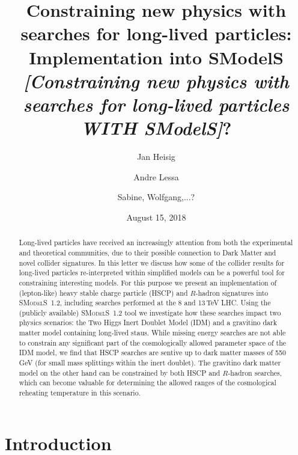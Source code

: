 \documentclass[preprint,number,sort&compress,twocolumn,3p]{elsstyarticle}
\newcommand{\smo}{\textsc{SModelS}}
\newcommand{\com}[1]{\emph{\color{red}[#1]}}  %
\begin{document}
\title{{%
Constraining new physics with
searches for long-lived particles:
Implementation into SModelS} \com{Constraining new physics with
searches for long-lived particles WITH SModelS}? }

\date{August 15, 2018}
\author{Jan Heisig}
\address{Institute for Theoretical Particle Physics and Cosmology, RWTH Aachen University, 52056 Aachen, Germany}
\author{Andre Lessa}
\address{Centro de Ci\^encias Naturais e Humanas, Universidade Federal do ABC, Santo Andr\'e, 09210-580 SP, Brazil}
\author{Sabine, Wolfgang,...?}

\begin{abstract}
Long-lived particles have received an increasingly attention from
both the experimental and theoretical communities, due to their possible connection
to Dark Matter and novel collider signatures.
In this letter we discuss how some of the collider results for long-lived particles
re-interpreted within simplified models can be a powerful tool for constraining interesting models. For this purpose we present an implementation of (lepton-like) heavy stable charge
particle (HSCP) and $R$-hadron signatures into \smo~1.2, including searches 
performed at the 8 and 13\,TeV LHC. Using the (publicly available) \smo~1.2
tool we investigate how these searches impact two physics scenarios:
the Two Higgs Inert Doublet Model (IDM) and a gravitino dark matter model containing long-lived staus. 
While missing energy searches are not able to constrain any significant
part of the cosmologically allowed parameter space of the IDM model,
we find that HSCP searches are sentive up to dark
matter masses of 550\,GeV (for small mass splittings within the inert
doublet). The gravitino dark matter model on the other hand can be constrained by both HSCP and $R$-hadron searches, which can become
valuable for determining the allowed ranges of the cosmological reheating temperature in this scenario.
\end{abstract}

\maketitle






\section{Introduction}\label{sec:intro}
\end{document}
